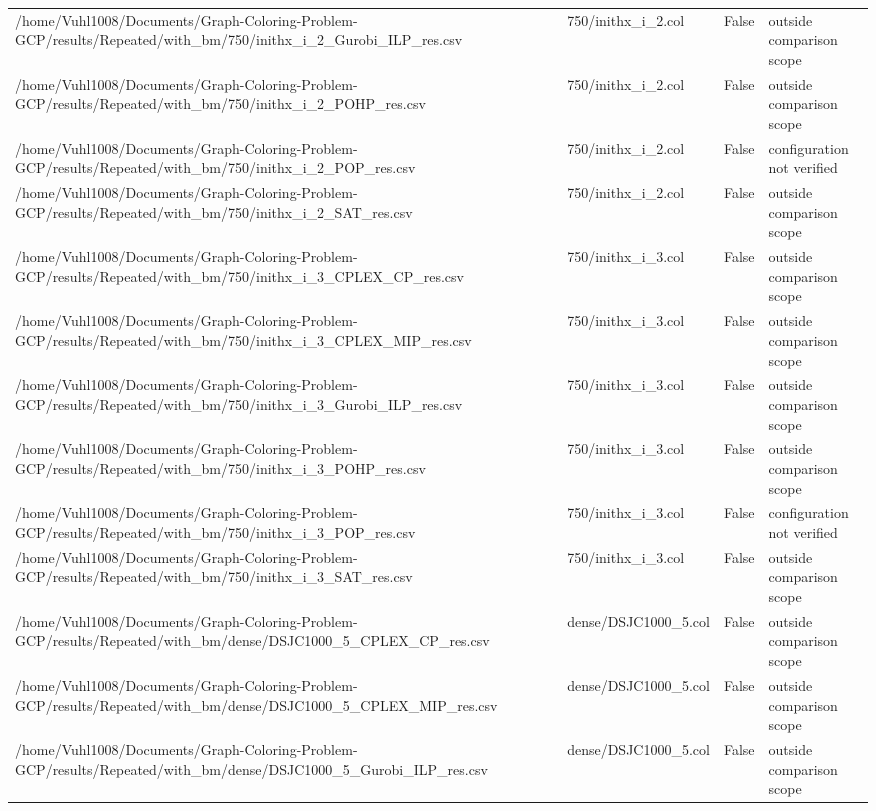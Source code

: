 \begin{table}[htbp]
\begin{tabular}{llll}
/home/Vuhl1008/Documents/Graph-Coloring-Problem-GCP/results/Repeated/with\_bm/750/inithx\_i\_2\_Gurobi\_ILP\_res.csv & 750/inithx\_i\_2.col & False & outside comparison scope \\
/home/Vuhl1008/Documents/Graph-Coloring-Problem-GCP/results/Repeated/with\_bm/750/inithx\_i\_2\_POHP\_res.csv & 750/inithx\_i\_2.col & False & outside comparison scope \\
/home/Vuhl1008/Documents/Graph-Coloring-Problem-GCP/results/Repeated/with\_bm/750/inithx\_i\_2\_POP\_res.csv & 750/inithx\_i\_2.col & False & configuration not verified \\
/home/Vuhl1008/Documents/Graph-Coloring-Problem-GCP/results/Repeated/with\_bm/750/inithx\_i\_2\_SAT\_res.csv & 750/inithx\_i\_2.col & False & outside comparison scope \\
/home/Vuhl1008/Documents/Graph-Coloring-Problem-GCP/results/Repeated/with\_bm/750/inithx\_i\_3\_CPLEX\_CP\_res.csv & 750/inithx\_i\_3.col & False & outside comparison scope \\
/home/Vuhl1008/Documents/Graph-Coloring-Problem-GCP/results/Repeated/with\_bm/750/inithx\_i\_3\_CPLEX\_MIP\_res.csv & 750/inithx\_i\_3.col & False & outside comparison scope \\
/home/Vuhl1008/Documents/Graph-Coloring-Problem-GCP/results/Repeated/with\_bm/750/inithx\_i\_3\_Gurobi\_ILP\_res.csv & 750/inithx\_i\_3.col & False & outside comparison scope \\
/home/Vuhl1008/Documents/Graph-Coloring-Problem-GCP/results/Repeated/with\_bm/750/inithx\_i\_3\_POHP\_res.csv & 750/inithx\_i\_3.col & False & outside comparison scope \\
/home/Vuhl1008/Documents/Graph-Coloring-Problem-GCP/results/Repeated/with\_bm/750/inithx\_i\_3\_POP\_res.csv & 750/inithx\_i\_3.col & False & configuration not verified \\
/home/Vuhl1008/Documents/Graph-Coloring-Problem-GCP/results/Repeated/with\_bm/750/inithx\_i\_3\_SAT\_res.csv & 750/inithx\_i\_3.col & False & outside comparison scope \\
/home/Vuhl1008/Documents/Graph-Coloring-Problem-GCP/results/Repeated/with\_bm/dense/DSJC1000\_5\_CPLEX\_CP\_res.csv & dense/DSJC1000\_5.col & False & outside comparison scope \\
/home/Vuhl1008/Documents/Graph-Coloring-Problem-GCP/results/Repeated/with\_bm/dense/DSJC1000\_5\_CPLEX\_MIP\_res.csv & dense/DSJC1000\_5.col & False & outside comparison scope \\
/home/Vuhl1008/Documents/Graph-Coloring-Problem-GCP/results/Repeated/with\_bm/dense/DSJC1000\_5\_Gurobi\_ILP\_res.csv & dense/DSJC1000\_5.col & False & outside comparison scope \\

\end{tabular}
\end{table}
